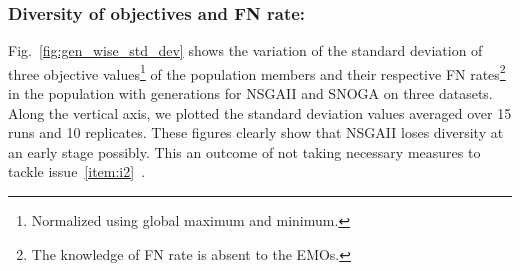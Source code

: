 \subsubsection{Diversity of objectives and FN rate:}\label{subsubsec:diversity} Fig.~\ref{fig:gen_wise_std_dev} shows the variation of the standard deviation of three objective values\footnote{Normalized using global maximum and minimum.} of the population members and their respective FN rates\footnote{The knowledge of FN rate is absent to the EMOs.} in the population with generations for NSGAII and SNOGA on three datasets. Along the vertical axis, we plotted the standard deviation values averaged over 15 runs and 10 replicates. These figures clearly show that NSGAII loses diversity at an early stage possibly. This an outcome of not taking necessary measures to tackle issue~\ref{item:i2}~\cite{qu2010multi}.    

